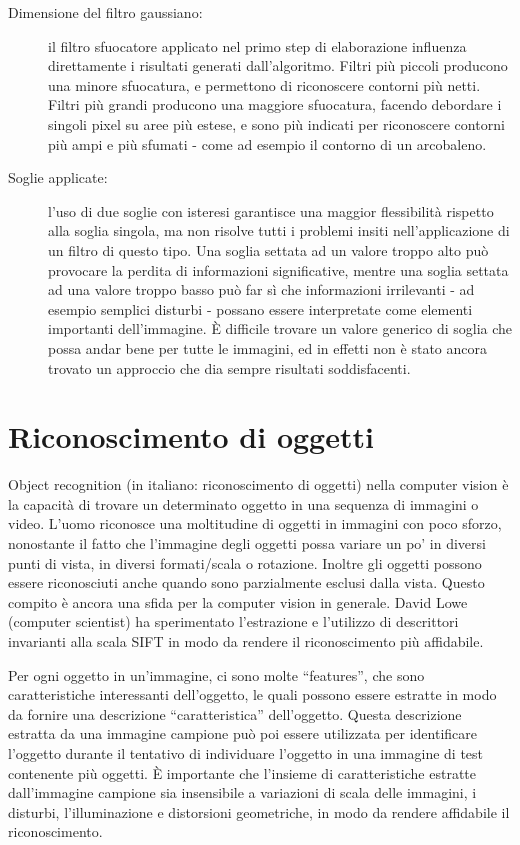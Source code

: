 \begin{description}
\item[Dimensione del filtro gaussiano:] il filtro sfuocatore applicato nel primo step di elaborazione influenza direttamente i risultati generati dall'algoritmo. Filtri più piccoli producono una minore sfuocatura, e permettono di riconoscere contorni più netti. Filtri più grandi producono una maggiore sfuocatura, facendo debordare i singoli pixel su aree più estese, e sono più indicati per riconoscere contorni più ampi e più sfumati - come ad esempio il contorno di un arcobaleno.
\item[Soglie applicate:] l'uso di due soglie con isteresi garantisce una maggior flessibilità rispetto alla soglia singola, ma non risolve tutti i problemi insiti nell'applicazione di un filtro di questo tipo. Una soglia settata ad un valore troppo alto può provocare la perdita di informazioni significative, mentre una soglia settata ad una valore troppo basso può far sì che informazioni irrilevanti - ad esempio semplici disturbi - possano essere interpretate come elementi importanti dell'immagine. È difficile trovare un valore generico di soglia che possa andar bene per tutte le immagini, ed in effetti non è stato ancora trovato un approccio che dia sempre risultati soddisfacenti.
\end{description}

\section{Riconoscimento di oggetti}
Object recognition (in italiano: riconoscimento di oggetti) nella computer vision è la capacità di trovare un determinato oggetto in una sequenza di immagini o video. L'uomo riconosce una moltitudine di oggetti in immagini con poco sforzo, nonostante il fatto che l'immagine degli oggetti possa variare un po' in diversi punti di vista, in diversi formati/scala o rotazione. Inoltre gli oggetti possono essere riconosciuti anche quando sono parzialmente esclusi dalla vista. Questo compito è ancora una sfida per la computer vision in generale. David Lowe (computer scientist) ha sperimentato l'estrazione e l'utilizzo di descrittori invarianti alla scala SIFT in modo da rendere il riconoscimento più affidabile.

Per ogni oggetto in un'immagine, ci sono molte ``features'', che sono caratteristiche interessanti dell'oggetto, le quali possono essere estratte in modo da fornire una descrizione ``caratteristica'' dell'oggetto. Questa descrizione estratta da una immagine campione può poi essere utilizzata per identificare l'oggetto durante il tentativo di individuare l'oggetto in una immagine di test contenente più oggetti. È importante che l'insieme di caratteristiche estratte dall'immagine campione sia insensibile a variazioni di scala delle immagini, i disturbi, l'illuminazione e distorsioni geometriche, in modo da rendere affidabile il riconoscimento.

